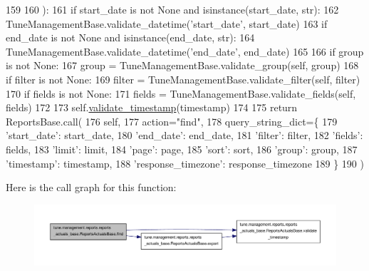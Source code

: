 \begin{DoxyCode}
159 
160     ):
161         \textcolor{keywordflow}{if} start\_date \textcolor{keywordflow}{is} \textcolor{keywordflow}{not} \textcolor{keywordtype}{None} \textcolor{keywordflow}{and} isinstance(start\_date, str):
162             TuneManagementBase.validate\_datetime(\textcolor{stringliteral}{'start\_date'}, start\_date)
163         \textcolor{keywordflow}{if} end\_date \textcolor{keywordflow}{is} \textcolor{keywordflow}{not} \textcolor{keywordtype}{None} \textcolor{keywordflow}{and} isinstance(end\_date, str):
164             TuneManagementBase.validate\_datetime(\textcolor{stringliteral}{'end\_date'}, end\_date)
165 
166         \textcolor{keywordflow}{if} group \textcolor{keywordflow}{is} \textcolor{keywordflow}{not} \textcolor{keywordtype}{None}:
167             group = TuneManagementBase.validate\_group(self, group)
168         \textcolor{keywordflow}{if} filter \textcolor{keywordflow}{is} \textcolor{keywordflow}{not} \textcolor{keywordtype}{None}:
169             filter = TuneManagementBase.validate\_filter(self, filter)
170         \textcolor{keywordflow}{if} fields \textcolor{keywordflow}{is} \textcolor{keywordflow}{not} \textcolor{keywordtype}{None}:
171             fields = TuneManagementBase.validate\_fields(self, fields)
172 
173         self.\hyperlink{classtune_1_1management_1_1reports_1_1reports__actuals__base_1_1ReportsActualsBase_a2808fb349b9515465dab9d2c1e12cafd}{validate\_timestamp}(timestamp)
174 
175         \textcolor{keywordflow}{return} ReportsBase.call(
176             self,
177             action=\textcolor{stringliteral}{"find"},
178             query\_string\_dict=\{
179                 \textcolor{stringliteral}{'start\_date'}: start\_date,
180                 \textcolor{stringliteral}{'end\_date'}: end\_date,
181                 \textcolor{stringliteral}{'filter'}: filter,
182                 \textcolor{stringliteral}{'fields'}: fields,
183                 \textcolor{stringliteral}{'limit'}: limit,
184                 \textcolor{stringliteral}{'page'}: page,
185                 \textcolor{stringliteral}{'sort'}: sort,
186                 \textcolor{stringliteral}{'group'}: group,
187                 \textcolor{stringliteral}{'timestamp'}: timestamp,
188                 \textcolor{stringliteral}{'response\_timezone'}: response\_timezone
189             \}
190         )

\end{DoxyCode}


Here is the call graph for this function\-:
\nopagebreak
\begin{figure}[H]
\begin{center}
\leavevmode
\includegraphics[width=350pt]{classtune_1_1management_1_1reports_1_1reports__actuals__base_1_1ReportsActualsBase_a5ec06fdd1b657010235b66d4a5521e44_cgraph}
\end{center}
\end{figure}




